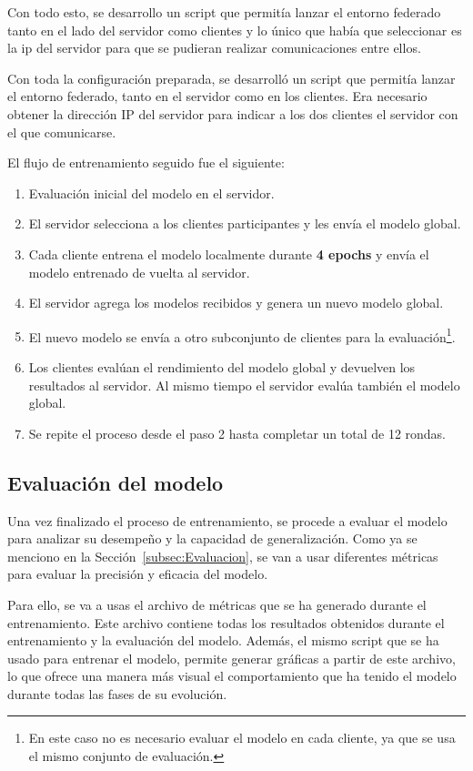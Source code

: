 Con todo esto, se desarrollo un script que permitía lanzar el entorno federado tanto en el lado del servidor como clientes y lo único que había que seleccionar es la ip del servidor para que se pudieran realizar comunicaciones entre ellos.

Con toda la configuración preparada, se desarrolló un script que permitía lanzar el entorno federado, tanto en el servidor como en los clientes. Era necesario obtener la dirección IP del servidor para indicar a los dos clientes el servidor con el que comunicarse.

El flujo de entrenamiento seguido fue el siguiente:
\begin{enumerate}
    \item Evaluación inicial del modelo en el servidor.
    \item El servidor selecciona a los clientes participantes y les envía el modelo global.
    \item Cada cliente entrena el modelo localmente durante \textbf{4 epochs} y envía el modelo entrenado de vuelta al servidor.
    \item El servidor agrega los modelos recibidos y genera un nuevo modelo global.
    \item El nuevo modelo se envía a otro subconjunto de clientes para la evaluación\footnote{En este caso no es necesario evaluar el modelo en cada cliente, ya que se usa el mismo conjunto de evaluación.}.
    \item Los clientes evalúan el rendimiento del modelo global y devuelven los resultados al servidor. Al mismo tiempo el servidor evalúa también el modelo global.
    \item Se repite el proceso desde el paso 2 hasta completar un total de 12 rondas.
\end{enumerate}


\subsection{Evaluación del modelo}
\label{subsec:EvaluacionModelo}
Una vez finalizado el proceso de entrenamiento, se procede a evaluar el modelo para analizar su desempeño y la capacidad de generalización. Como ya se menciono en la Sección~\ref{subsec:Evaluacion}, se van a usar diferentes métricas para evaluar la precisión y eficacia del modelo.

Para ello, se va a usas el archivo de métricas que se ha generado durante el entrenamiento. Este archivo contiene todas los resultados obtenidos durante el entrenamiento y la evaluación del modelo. Además, el mismo script que se ha usado para entrenar el modelo, permite generar gráficas a partir de este archivo, lo que ofrece una manera más visual el comportamiento que ha tenido el modelo durante todas las fases de su evolución.

